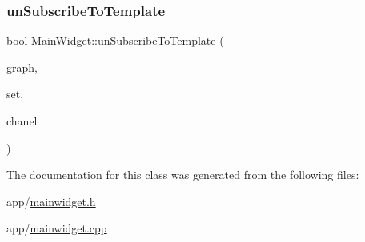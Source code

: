 \hypertarget{class_main_widget_aafe021c318c70fbf579693ff767bce27}{}\label{class_main_widget_aafe021c318c70fbf579693ff767bce27} 
\subsubsection{\texorpdfstring{un\+Subscribe\+To\+Template}{unSubscribeToTemplate}}
{\footnotesize\ttfamily bool Main\+Widget\+::un\+Subscribe\+To\+Template (\begin{DoxyParamCaption}\item[{\hyperlink{class_graph}{Graph} $\ast$}]{graph,  }\item[{Q\+X\+Y\+Series $\ast$}]{set,  }\item[{int}]{chanel }\end{DoxyParamCaption})\hspace{0.3cm}{\ttfamily [slot]}}



The documentation for this class was generated from the following files\+:\begin{DoxyCompactItemize}
\item 
app/\hyperlink{mainwidget_8h}{mainwidget.\+h}\item 
app/\hyperlink{mainwidget_8cpp}{mainwidget.\+cpp}\end{DoxyCompactItemize}
